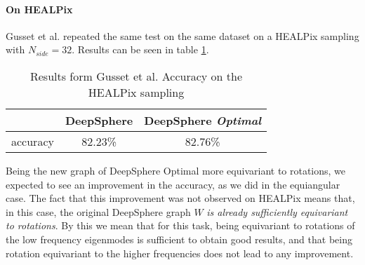 \paragraph{On HEALPix }
Gusset et al. repeated the same test on the same dataset on a HEALPix sampling with $N_{side}=32$. Results can be seen in table \ref{table:results}.
\begin{table}[h!]
	\centering
	\begin{tabular}{ c|c|c } 
		& DeepSphere & DeepSphere \textit{Optimal} \\ 
		\hline
		accuracy & 82.23\% & 82.76\% \\ 
	\end{tabular}
	\caption{\label{table:results}Results form Gusset et al. Accuracy on the HEALPix sampling}
\end{table}
Being the new graph of DeepSphere Optimal more equivariant to rotations, we expected to see an improvement in the accuracy, as we did in the equiangular case. The fact that this improvement was not observed on HEALPix means that, in this case, the original DeepSphere graph $W$ \textit{is already sufficiently equivariant to rotations}. By this we mean that for this task, being equivariant to rotations of the low frequency eigenmodes is sufficient to obtain good results, and that being rotation equivariant to the higher frequencies does not lead to any improvement.
